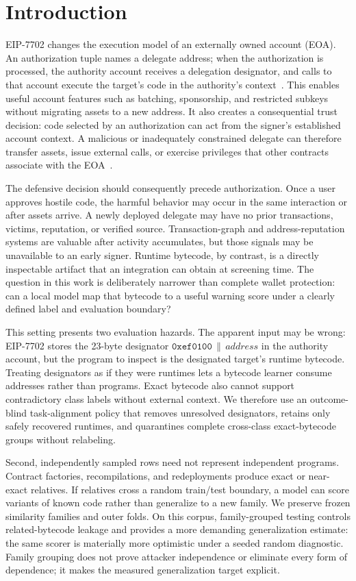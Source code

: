\section{Introduction}
\label{sec:introduction}

EIP-7702 changes the execution model of an externally owned account (EOA). An authorization tuple names a delegate address; when the authorization is processed, the authority account receives a delegation designator, and calls to that account execute the target's code in the authority's context~\cite{eip7702}. This enables useful account features such as batching, sponsorship, and restricted subkeys without migrating assets to a new address. It also creates a consequential trust decision: code selected by an authorization can act from the signer's established account context. A malicious or inadequately constrained delegate can therefore transfer assets, issue external calls, or exercise privileges that other contracts associate with the EOA~\cite{eip7702,qi2025eip7702phishing,huang2026darkside}.

The defensive decision should consequently precede authorization. Once a user approves hostile code, the harmful behavior may occur in the same interaction or after assets arrive. A newly deployed delegate may have no prior transactions, victims, reputation, or verified source. Transaction-graph and address-reputation systems are valuable after activity accumulates, but those signals may be unavailable to an early signer. Runtime bytecode, by contrast, is a directly inspectable artifact that an integration can obtain at screening time. The question in this work is deliberately narrower than complete wallet protection: can a local model map that bytecode to a useful warning score under a clearly defined label and evaluation boundary?

This setting presents two evaluation hazards. The apparent input may be wrong: EIP-7702 stores the 23-byte designator $\mathtt{0xef0100}\,\|\,\textit{address}$ in the authority account, but the program to inspect is the designated target's runtime bytecode. Treating designators as if they were runtimes lets a bytecode learner consume addresses rather than programs. Exact bytecode also cannot support contradictory class labels without external context. We therefore use an outcome-blind task-alignment policy that removes unresolved designators, retains only safely recovered runtimes, and quarantines complete cross-class exact-bytecode groups without relabeling.

Second, independently sampled rows need not represent independent programs. Contract factories, recompilations, and redeployments produce exact or near-exact relatives. If relatives cross a random train/test boundary, a model can score variants of known code rather than generalize to a new family. We preserve frozen similarity families and outer folds. On this corpus, family-grouped testing controls related-bytecode leakage and provides a more demanding generalization estimate: the same scorer is materially more optimistic under a seeded random diagnostic. Family grouping does not prove attacker independence or eliminate every form of dependence; it makes the measured generalization target explicit.

